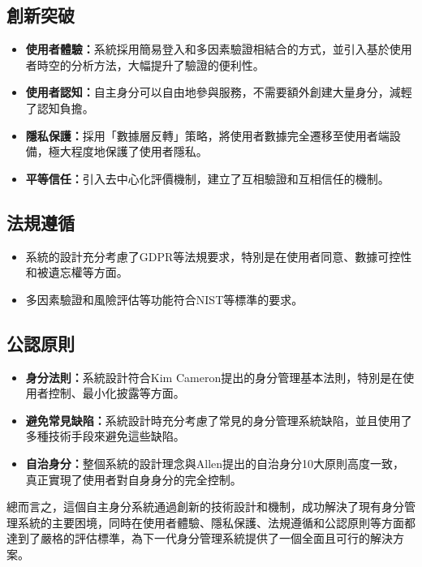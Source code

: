\subsection{創新突破}
\begin{itemize}
  \item \textbf{使用者體驗：}系統採用簡易登入和多因素驗證相結合的方式，並引入基於使用者時空的分析方法，大幅提升了驗證的便利性。
  \item \textbf{使用者認知：}自主身分可以自由地參與服務，不需要額外創建大量身分，減輕了認知負擔。
  \item \textbf{隱私保護：}採用「數據層反轉」策略，將使用者數據完全遷移至使用者端設備，極大程度地保護了使用者隱私。
  \item \textbf{平等信任：}引入去中心化評價機制，建立了互相驗證和互相信任的機制。
\end{itemize}
\subsection{法規遵循}
\begin{itemize}
  \item 系統的設計充分考慮了GDPR等法規要求，特別是在使用者同意、數據可控性和被遺忘權等方面。
  \item 多因素驗證和風險評估等功能符合NIST等標準的要求。
\end{itemize}
\subsection{公認原則}
\begin{itemize}
  \item \textbf{身分法則：}系統設計符合Kim Cameron提出的身分管理基本法則，特別是在使用者控制、最小化披露等方面。
  \item \textbf{避免常見缺陷：}系統設計時充分考慮了常見的身分管理系統缺陷，並且使用了多種技術手段來避免這些缺陷。
  \item \textbf{自治身分：}整個系統的設計理念與Allen提出的自治身分10大原則高度一致，真正實現了使用者對自身身分的完全控制。
\end{itemize}
總而言之，這個自主身分系統通過創新的技術設計和機制，成功解決了現有身分管理系統的主要困境，同時在使用者體驗、隱私保護、法規遵循和公認原則等方面都達到了嚴格的評估標準，為下一代身分管理系統提供了一個全面且可行的解決方案。

